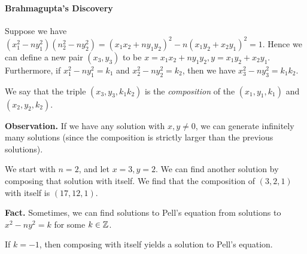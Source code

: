 \documentclass[class=article, crop=false]{standalone}
\begin{document}
  \paragraph{Brahmagupta's Discovery} \par
  Suppose we have $(x_1^2 - ny_1^2)(n_2^2 - ny_2^2) = (x_1x_2 + ny_1y_2)^2 - n(x_1y_2 + x_2y_1)^2 = 1$. Hence we can define a new pair $(x_3, y_3)$ to be $x = x_1x_2 + ny_1y_2, y = x_1y_2 + x_2y_1$. Furthermore, if $x_1^2-ny_1^2 = k_1$ and $x_2^2-ny_2^2 = k_2$, then we have $x_3^2 - ny_3^2 = k_1k_2$. \par
  We say that the triple $(x_3, y_3, k_1k_2)$ is the \emph{composition} of the $(x_1,y_1,k_1)$ and $(x_2,y_2,k_2)$. \par
  \textbf{Observation.} If we have any solution with $x, y\neq 0$, we can generate infinitely many solutions (since the composition is strictly larger than the previous solutions).
  \begin{example}{}
    We start with $n = 2$, and let $x = 3, y = 2$. We can find another solution by composing that solution with itself. We find that the composition of $(3, 2, 1)$ with itself is $(17, 12, 1)$.
  \end{example}
  \textbf{Fact.} Sometimes, we can find solutions to Pell's equation from solutions to $x^2 - ny^2 = k$ for some $k\in\mathbb{Z}$.
  \begin{example}{}
    If $k = -1$, then composing with itself yields a solution to Pell's equation.
  \end{example}
\end{document}
